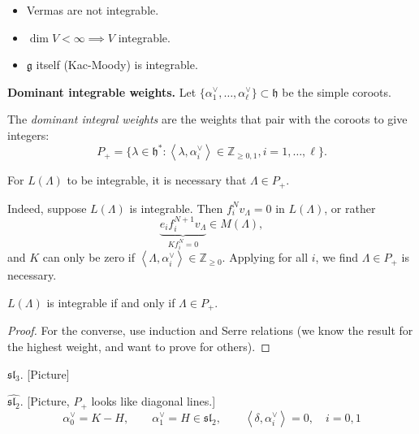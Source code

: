 \begin{remark}
\label{remark-integrability}
\begin{itemize}
\item Vermas are not integrable.
\item $\dim V< \infty \implies V$ integrable.
\item $\mathfrak{g}$ itself (Kac-Moody) is integrable.
\end{itemize}
\end{remark}

\medskip\noindent
{\bf Dominant integrable weights.} 
Let $\{\alpha_1^\vee,\ldots,\alpha_\ell^\vee\}\subset\mathfrak{h}$ be the simple
coroots.

\begin{definition}
\label{definition-dominant-integral-weights}
The {\it dominant integral weights} are the weights that pair with the coroots
to give integers:
$$
P_+=\{\lambda \in \mathfrak{h}^* :
\left<\lambda,\alpha_i^\vee\right>\in\mathbb{Z}_{\geq 0,1},
i=1,\ldots,\ell\}.
$$
\end{definition}

For $L(\Lambda)$ to be integrable, it is necessary that $\Lambda \in P_+$.

Indeed, suppose $L(\Lambda)$ is integrable.
Then $f_i^Nv_\Lambda=0$ in $L(\Lambda)$,
or rather 
$$
\underbrace{e_if_i^{N+1}v_\Lambda}
_{Kf_i^N=0} \in M(\Lambda),
$$
and $K$ can only be zero if $\left<\Lambda,\alpha_i^\vee\right>
\in \mathbb{Z}_{\geq 0}$. Applying for all $i$, we find
$\Lambda \in P_+$ is necessary.

\begin{proposition}
\label{proposition-integrable-iff-dominant-integral-weight}
$L(\Lambda)$ is integrable if and only if $\Lambda \in P_+$.
\end{proposition}

\begin{proof}
For the converse, use induction and Serre relations 
(we know the result for the highest weight, and want
to prove for others).
\end{proof}

\begin{example}
\label{example-sl3-integrability}
$\mathfrak{sl}_3$. [Picture]
\end{example}

\begin{example}
\label{example-sl_2hat-integrability}
$\widehat{\mathfrak{sl}_2}$. [Picture, $P_+$ looks like diagonal lines.]
$$
\alpha_0^\vee=K-H,\qquad \alpha_1^\vee=H\in\mathfrak{sl}_2,
\qquad \left<\delta,\alpha_i^\vee\right>=0,\quad i=0,1
$$
\end{example}

